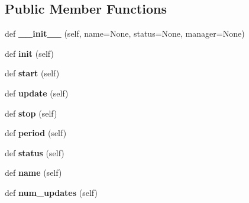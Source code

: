\subsection*{Public Member Functions}
\begin{DoxyCompactItemize}
\item 
\mbox{\label{classelma_1_1api_1_1process_1_1Process_a7a539964a64e16cc8bc42e15124df35e}} 
def {\bfseries \+\_\+\+\_\+init\+\_\+\+\_\+} (self, name=None, status=None, manager=None)
\item 
\mbox{\label{classelma_1_1api_1_1process_1_1Process_a04c3be5718b17eac25b42779ea368793}} 
def {\bfseries init} (self)
\item 
\mbox{\label{classelma_1_1api_1_1process_1_1Process_a61245c078eec81fa9ce79105942e7cb3}} 
def {\bfseries start} (self)
\item 
\mbox{\label{classelma_1_1api_1_1process_1_1Process_ab95818df6159186c9d286963ad561da1}} 
def {\bfseries update} (self)
\item 
\mbox{\label{classelma_1_1api_1_1process_1_1Process_a2751375eb541bb0dae8211d4b692b4fc}} 
def {\bfseries stop} (self)
\item 
\mbox{\label{classelma_1_1api_1_1process_1_1Process_a8e37ba949b3285fe52ca8638cdcb0bb9}} 
def {\bfseries period} (self)
\item 
\mbox{\label{classelma_1_1api_1_1process_1_1Process_a6dc2725cd3d032b3ec80e0fc6c52a994}} 
def {\bfseries status} (self)
\item 
\mbox{\label{classelma_1_1api_1_1process_1_1Process_affa061fab12e699d4d04471bfaf52a1a}} 
def {\bfseries name} (self)
\item 
\mbox{\label{classelma_1_1api_1_1process_1_1Process_ad0a58ddb9103ec226c42892e5a3d2c3f}} 
def {\bfseries num\+\_\+updates} (self)
\item 

\end{DoxyCompactItemize}
